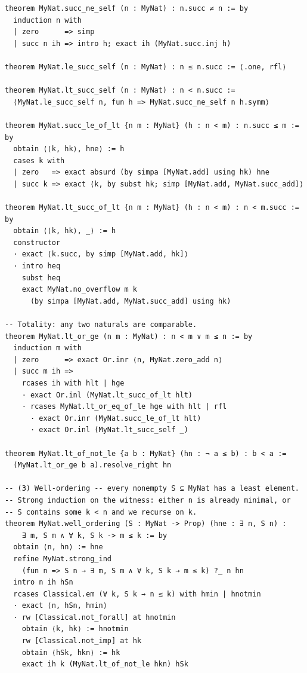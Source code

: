 \documentclass[12pt, openany]{book}
\theoremstyle{plain}
\theoremstyle{definition}
\theoremstyle{remark}
\begin{document}
\begin{leanbox}
\begin{lstlisting}
theorem MyNat.succ_ne_self (n : MyNat) : n.succ ≠ n := by
  induction n with
  | zero      => simp
  | succ n ih => intro h; exact ih (MyNat.succ.inj h)

theorem MyNat.le_succ_self (n : MyNat) : n ≤ n.succ := ⟨.one, rfl⟩

theorem MyNat.lt_succ_self (n : MyNat) : n < n.succ :=
  ⟨MyNat.le_succ_self n, fun h => MyNat.succ_ne_self n h.symm⟩

theorem MyNat.succ_le_of_lt {n m : MyNat} (h : n < m) : n.succ ≤ m := by
  obtain ⟨⟨k, hk⟩, hne⟩ := h
  cases k with
  | zero   => exact absurd (by simpa [MyNat.add] using hk) hne
  | succ k => exact ⟨k, by subst hk; simp [MyNat.add, MyNat.succ_add]⟩

theorem MyNat.lt_succ_of_lt {n m : MyNat} (h : n < m) : n < m.succ := by
  obtain ⟨⟨k, hk⟩, _⟩ := h
  constructor
  · exact ⟨k.succ, by simp [MyNat.add, hk]⟩
  · intro heq
    subst heq
    exact MyNat.no_overflow m k
      (by simpa [MyNat.add, MyNat.succ_add] using hk)

-- Totality: any two naturals are comparable.
theorem MyNat.lt_or_ge (n m : MyNat) : n < m ∨ m ≤ n := by
  induction m with
  | zero      => exact Or.inr ⟨n, MyNat.zero_add n⟩
  | succ m ih =>
    rcases ih with hlt | hge
    · exact Or.inl (MyNat.lt_succ_of_lt hlt)
    · rcases MyNat.lt_or_eq_of_le hge with hlt | rfl
      · exact Or.inr (MyNat.succ_le_of_lt hlt)
      · exact Or.inl (MyNat.lt_succ_self _)

theorem MyNat.lt_of_not_le {a b : MyNat} (hn : ¬ a ≤ b) : b < a :=
  (MyNat.lt_or_ge b a).resolve_right hn

-- (3) Well-ordering -- every nonempty S ⊆ MyNat has a least element.
-- Strong induction on the witness: either n is already minimal, or
-- S contains some k < n and we recurse on k.
theorem MyNat.well_ordering (S : MyNat -> Prop) (hne : ∃ n, S n) :
    ∃ m, S m ∧ ∀ k, S k -> m ≤ k := by
  obtain ⟨n, hn⟩ := hne
  refine MyNat.strong_ind
    (fun n => S n → ∃ m, S m ∧ ∀ k, S k → m ≤ k) ?_ n hn
  intro n ih hSn
  rcases Classical.em (∀ k, S k → n ≤ k) with hmin | hnotmin
  · exact ⟨n, hSn, hmin⟩
  · rw [Classical.not_forall] at hnotmin
    obtain ⟨k, hk⟩ := hnotmin
    rw [Classical.not_imp] at hk
    obtain ⟨hSk, hkn⟩ := hk
    exact ih k (MyNat.lt_of_not_le hkn) hSk
\end{lstlisting}
\end{leanbox}
\color{black}
\end{document}
